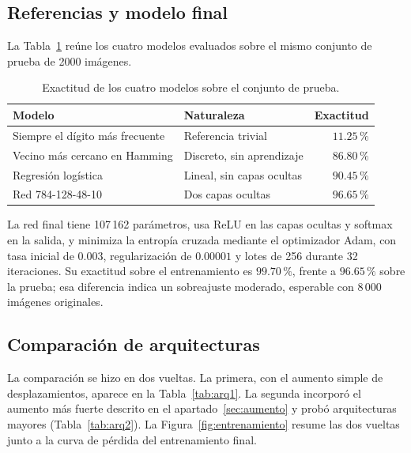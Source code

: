 \documentclass[12pt,letterpaper]{article}
\newcommand{\pc}{\,\%}
\begin{document}
\subsection{Referencias y modelo final}
\label{sec:referencias}

La Tabla~\ref{tab:modelos} reúne los cuatro modelos evaluados sobre el mismo
conjunto de prueba de 2000 imágenes.

\begin{table}[htbp]
\centering
\caption{Exactitud de los cuatro modelos sobre el conjunto de prueba.}
\label{tab:modelos}
\begin{tabular}{llr}
\toprule
\textbf{Modelo} & \textbf{Naturaleza} & \textbf{Exactitud} \\
\midrule
Siempre el dígito más frecuente & Referencia trivial & $11.25\pc$ \\
Vecino más cercano en Hamming & Discreto, sin aprendizaje & $86.80\pc$ \\
Regresión logística & Lineal, sin capas ocultas & $90.45\pc$ \\
Red 784-128-48-10 & Dos capas ocultas & $\mathbf{96.65\pc}$ \\
\bottomrule
\end{tabular}
\end{table}

La red final tiene 107\,162 parámetros, usa ReLU en las capas ocultas y softmax en
la salida, y minimiza la entropía cruzada mediante el optimizador Adam, con tasa
inicial de $0.003$, regularización de $0.00001$ y lotes de 256 durante 32
iteraciones. Su exactitud sobre el entrenamiento es $99.70\pc$, frente a $96.65\pc$
sobre la prueba; esa diferencia indica un sobreajuste moderado, esperable con 8\,000
imágenes originales.

\subsection{Comparación de arquitecturas}

La comparación se hizo en dos vueltas. La primera, con el aumento simple de
desplazamientos, aparece en la Tabla~\ref{tab:arq1}. La segunda incorporó el aumento
más fuerte descrito en el apartado~\ref{sec:aumento} y probó arquitecturas mayores
(Tabla~\ref{tab:arq2}). La Figura~\ref{fig:entrenamiento} resume las dos vueltas
junto a la curva de pérdida del entrenamiento final.
\end{document}
